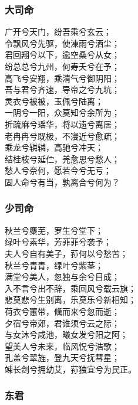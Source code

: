 \documentclass[]{article}
\begin{document}
\hypertarget{header-n2797}{%
\subsubsection{大司命}\label{header-n2797}}

广开兮天门，纷吾乘兮玄云；\\
令飘风兮先驱，使涷雨兮洒尘；\\
君回翔兮以下，逾空桑兮从女；\\
纷总总兮九州，何寿夭兮在予；\\
高飞兮安翔，乘清气兮御阴阳；\\
吾与君兮齐速，导帝之兮九坑；\\
灵衣兮被被，玉佩兮陆离；\\
一阴兮一阳，众莫知兮余所为；\\
折疏麻兮瑶华，将以遗兮离居；\\
老冉冉兮既极，不寖近兮愈疏；\\
乘龙兮辚辚，高驰兮冲天；\\
结桂枝兮延伫，羌愈思兮愁人；\\
愁人兮奈何，愿若今兮无亏；\\
固人命兮有当，孰离合兮何为？

\hypertarget{header-n2802}{%
\subsubsection{少司命}\label{header-n2802}}

秋兰兮麋芜，罗生兮堂下；\\
绿叶兮素华，芳菲菲兮袭予；\\
夫人兮自有美子，荪何以兮愁苦；\\
秋兰兮青青，绿叶兮紫茎；\\
满堂兮美人，忽独与余兮目成；\\
入不言兮出不辞，乘回风兮载云旗；\\
悲莫悲兮生别离，乐莫乐兮新相知；\\
荷衣兮蕙带，儵而来兮忽而逝；\\
夕宿兮帝郊，君谁须兮云之际；\\
与女沐兮咸池，曦女发兮阳之阿；\\
望美人兮未来，临风怳兮浩歌；\\
孔盖兮翠旌，登九天兮抚彗星；\\
竦长剑兮拥幼艾，荪独宜兮为民正。

\hypertarget{header-n2807}{%
\subsubsection{东君}\label{header-n2807}}
\end{document}
